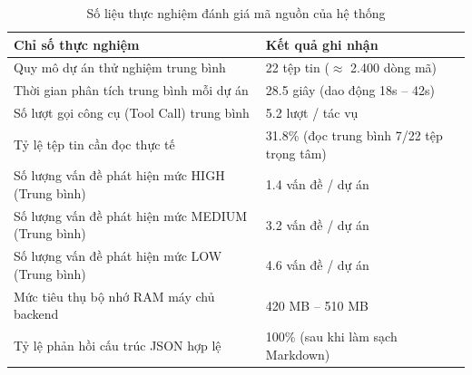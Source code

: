 \documentclass[12pt,a4paper]{report}
\begin{document}
\begin{table}[H]
\centering
\caption{Số liệu thực nghiệm đánh giá mã nguồn của hệ thống}
\label{tab:empirical_metrics}
\renewcommand{\arraystretch}{1.2}
\begin{tabular}{|p{8.0cm}|p{6.0cm}|}
\hline
\textbf{Chỉ số thực nghiệm} & \textbf{Kết quả ghi nhận} \\ \hline
Quy mô dự án thử nghiệm trung bình & 22 tệp tin ($\approx$ 2.400 dòng mã) \\ \hline
Thời gian phân tích trung bình mỗi dự án & 28.5 giây (dao động 18s -- 42s) \\ \hline
Số lượt gọi công cụ (Tool Call) trung bình & 5.2 lượt / tác vụ \\ \hline
Tỷ lệ tệp tin cần đọc thực tế & 31.8\% (đọc trung bình 7/22 tệp trọng tâm) \\ \hline
Số lượng vấn đề phát hiện mức HIGH (Trung bình) & 1.4 vấn đề / dự án \\ \hline
Số lượng vấn đề phát hiện mức MEDIUM (Trung bình) & 3.2 vấn đề / dự án \\ \hline
Số lượng vấn đề phát hiện mức LOW (Trung bình) & 4.6 vấn đề / dự án \\ \hline
Mức tiêu thụ bộ nhớ RAM máy chủ backend & 420 MB -- 510 MB \\ \hline
Tỷ lệ phản hồi cấu trúc JSON hợp lệ & 100\% (sau khi làm sạch Markdown) \\ \hline
\end{tabular}
\end{table}
\end{document}
